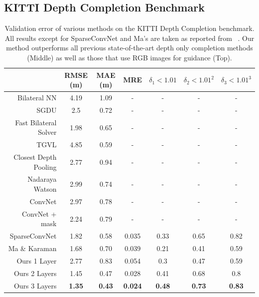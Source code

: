  
\subsection{KITTI Depth Completion Benchmark}
\label{sec:kitti-depth-compl}
\begin{table}
\centering
\begin{tabular}{r|cccccc}
  & RMSE (m) & MAE (m) & MRE & $\delta_1<1.01$ & $\delta_2<1.01^2$ & $\delta_3<1.01^3$\\\hline
  Bilateral NN\cite{Jampani2016CVPR} & 4.19 & 1.09 & - & - & - & -\\
  SGDU\cite{schneider2016semantically} & 2.5 & 0.72 & - & - & - & -\\
  Fast Bilateral Solver\cite{barron2016fast} & 1.98 & 0.65 & - & - & - & -\\
  TGVL\cite{Ferstl2013} & 4.85 & 0.59 & - & - & - & -\\\hline
  Closest Depth Pooling & 2.77 & 0.94 & - & - & - & -\\
  Nadaraya Watson\cite{Nadaraya,Watson} & 2.99 & 0.74 & - & - & - & -\\
  ConvNet & 2.97 & 0.78 & - & - & - & -\\
  ConvNet + mask & 2.24 & 0.79 & - & - & - & -\\
  SparseConvNet\cite{uhrig} & 1.82 & 0.58 & 0.035 & 0.33 & 0.65 & 0.82\\
  Ma \& Karaman\cite{sparsetodense}& 1.68 & 0.70 & 0.039 & 0.21 & 0.41 & 0.59\\\hline
  Ours 1 Layer & 2.77 & 0.83 & 0.054 & 0.3 & 0.47 & 0.59\\
  Ours 2 Layers & 1.45 & 0.47 & 0.028 & 0.41 & 0.68 & 0.8\\
  Ours 3 Layers & \textbf{1.35} & \textbf{0.43} & \textbf{0.024} & \textbf{0.48} & \textbf{0.73} & \textbf{0.83}\\
  \hline
 \end{tabular}
 \caption{Validation error of various methods on the KITTI Depth Completion benchmark. All results except for SparseConvNet and Ma's are taken as reported from ~\cite{uhrig}. Our method outperforms all previous state-of-the-art depth only completion methods (Middle) as well as those that use RGB images for guidance (Top).}
  \label{tab:kitti}
\end{table}



